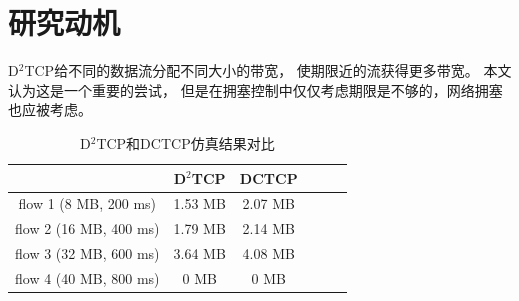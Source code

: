  \section{研究动机}
 \label{sec_LPD:Motivation} 
D$^2$TCP给不同的数据流分配不同大小的带宽，
使期限近的流获得更多带宽。
本文认为这是一个重要的尝试，
但是在拥塞控制中仅仅考虑期限是不够的，网络拥塞也应被考虑。
 
 
 \begin{table}[h]
\centering
\caption{D$^2$TCP和DCTCP仿真结果对比}\label{flowtable}
\renewcommand{\arraystretch}{1.5}
\begin{tabular}{|c|c|c|c|c|c|} \hline
\setlength{\tabcolsep}{10pt}
 & D$^2$TCP &  DCTCP \\ \hline
flow 1  (8 MB, 200 ms)   &1.53 MB &2.07 MB \\ \hline
flow 2  (16 MB, 400 ms)   &1.79 MB &2.14 MB \\ \hline
flow 3  (32 MB, 600 ms)   &3.64 MB &4.08 MB \\ \hline
flow 4  (40 MB, 800 ms)   &0 MB    &0 MB \\ \hline
\end{tabular}
\end{table}


